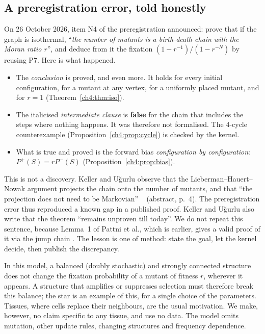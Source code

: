 \subsection{A preregistration error, told honestly}
\begin{warnbox}
\tierC{} On 26 October 2026, item N4 of the preregistration announced: prove that if the graph is isothermal,
``\emph{the number of mutants is a birth-death chain with the Moran ratio $r$}'', and deduce from it the fixation
$(1-r^{-1})/(1-r^{-N})$ by reusing P7. Here is what happened.
\begin{itemize}[itemsep=1pt]
\item The \emph{conclusion} is proved, and even more. It holds for every initial configuration, for a
mutant at any vertex, for a uniformly placed mutant, and for $r=1$ (Theorem~\ref{ch4:thm:iso}).
\item The italicised \emph{intermediate clause} is \textbf{false} for the chain that includes the steps where nothing
happens. It was therefore not formalised. The 4-cycle counterexample (Proposition~\ref{ch4:prop:cycle}) is
checked by the kernel.
\item What is true and proved is the forward bias \emph{configuration by configuration}:
$P^{+}(S)=rP^{-}(S)$ (Proposition~\ref{ch4:prop:bias}).
\end{itemize}
This is not a discovery. Keller and Uğurlu observe that the Lieberman--Hauert--Nowak argument projects the
chain onto the number of mutants, and that ``the projection does not need to be Markovian'' \tierL{}~\cite{ch4:KU}
(abstract, p.~4). The preregistration error thus reproduced a known gap in a published proof. Keller and
Uğurlu also write that the theorem ``remains unproven till today''. We do not repeat this sentence, because
Lemma~1 of Pattni et al., which is earlier, gives a valid proof of it via the jump chain \tierC. The lesson is one of
method: state the goal, let the kernel decide, then publish the discrepancy.
\end{warnbox}

\begin{physbox}
\tierC{} In this model, a balanced (doubly stochastic) and strongly connected structure does not change the
fixation probability of a mutant of fitness $r$, wherever it appears. A structure that amplifies or
suppresses selection must therefore break this balance; the star is an example of this, for a single choice of the
parameters. Tissues, where cells replace their neighbours, are the usual motivation. We make,
however, no claim specific to any tissue, and use no data. The model omits mutation,
other update rules, changing structures and frequency dependence.
\end{physbox}

